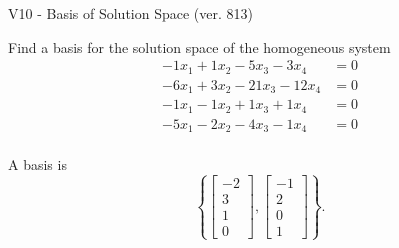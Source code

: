 \begin{exercise}
  \begin{exerciseTitle}V10 - Basis of Solution Space (ver. 813)\end{exerciseTitle}
  \begin{exerciseStatement}
    Find a basis for the solution space of the homogeneous system 
\begin{align*}
 -1 x_ 1 + 1 x_ 2 -5 x_ 3 -3 x_ 4 &= 0  \\ 
  -6 x_ 1 + 3 x_ 2 -21 x_ 3 -12 x_ 4 &= 0  \\ 
  -1 x_ 1 -1 x_ 2 + 1 x_ 3 + 1 x_ 4 &= 0  \\ 
  -5 x_ 1 -2 x_ 2 -4 x_ 3 -1 x_ 4 &= 0  \\ 
 \end{align*}


 
  \end{exerciseStatement}

  \begin{exerciseAnswer}
   A basis is   
\[\left\{\left[\begin{array}{c}
-2 \\
3 \\
1 \\
0
\end{array}\right] , \left[\begin{array}{c}
-1 \\
2 \\
0 \\
1
\end{array}\right]\right\}.\]

  


  \end{exerciseAnswer}
\end{exercise}